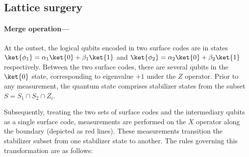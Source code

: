 \documentclass[11pt]{article}
\begin{document}
\subsection{Lattice surgery\label{subsec:lattice_surgery}}
\paragraph*{Merge operation---\!\!\!}
At the outset, the logical qubits encoded in two surface codes are in states $\ket{\phi_1} = \alpha_1 \ket{0} + \beta_1 \ket{1}$ and $\ket{\phi_2} = \alpha_2 \ket{0} + \beta_2 \ket{1}$ respectively. Between the two surface codes, there are several qubits in the $\ket{0}$ state, corresponding to eigenvalue $+1$ under the $Z$ operator. Prior to any measurement, the quantum state comprises stabilizer states from the subset $S = S_1 \cap S_2 \cap {Z_i}$.

Subsequently, treating the two sets of surface codes and the intermediary qubits as a single surface code, measurements are performed on the $X$ operator along the boundary (depicted as red lines). These measurements transition the stabilizer subset from one stabilizer state to another. The rules governing this transformation are as follows:
 
\end{document}

